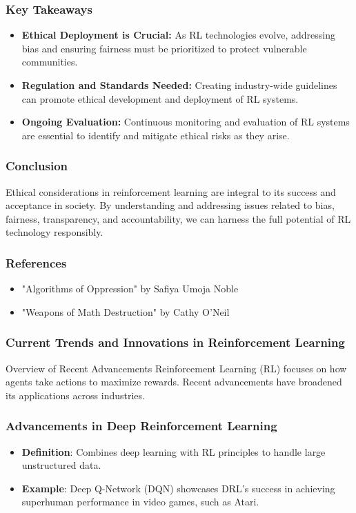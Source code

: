 \documentclass{beamer}
\begin{document}
\begin{frame}[fragile]
    \frametitle{Key Takeaways}
    \begin{itemize}
        \item \textbf{Ethical Deployment is Crucial:} As RL technologies evolve, addressing bias and ensuring fairness must be prioritized to protect vulnerable communities.
        \item \textbf{Regulation and Standards Needed:} Creating industry-wide guidelines can promote ethical development and deployment of RL systems.
        \item \textbf{Ongoing Evaluation:} Continuous monitoring and evaluation of RL systems are essential to identify and mitigate ethical risks as they arise.
    \end{itemize}
\end{frame}

\begin{frame}[fragile]
    \frametitle{Conclusion}
    Ethical considerations in reinforcement learning are integral to its success and acceptance in society. By understanding and addressing issues related to bias, fairness, transparency, and accountability, we can harness the full potential of RL technology responsibly.
\end{frame}

\begin{frame}[fragile]
    \frametitle{References}
    \begin{itemize}
        \item "Algorithms of Oppression" by Safiya Umoja Noble
        \item "Weapons of Math Destruction" by Cathy O'Neil
    \end{itemize}
\end{frame}

\begin{frame}[fragile]
    \frametitle{Current Trends and Innovations in Reinforcement Learning}
    \begin{block}{Overview of Recent Advancements}
        Reinforcement Learning (RL) focuses on how agents take actions to maximize rewards. Recent advancements have broadened its applications across industries.
    \end{block}
\end{frame}

\begin{frame}[fragile]
    \frametitle{Advancements in Deep Reinforcement Learning}
    \begin{itemize}
        \item \textbf{Definition}: Combines deep learning with RL principles to handle large unstructured data.
        \item \textbf{Example}: Deep Q-Network (DQN) showcases DRL's success in achieving superhuman performance in video games, such as Atari.
    \end{itemize}
\end{frame}
\end{document}
